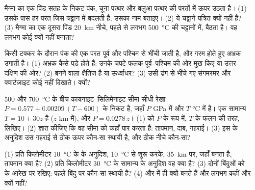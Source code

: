 \begin{exercise}[$\star\star$]\label{exo:g12:metamorphic-rocks:10}
मैग्मा का एक पिंड सतह के निकट पंक, चूना पत्थर और बलुआ पत्थर की परतों में ऊपर उठता है।
(1) उसके पास हर परत जिस चट्टान में बदलती है, उसका नाम बताइए। (2) ये
चट्टानें पत्रित क्यों नहीं हैं? (3) मैग्मा का एक दूसरा पिंड \qty{20}{km} नीचे,
पहले से लगभग \qty{500}{\celsius} की चट्टानों में, बैठता है। वह लगभग कोई  क्यों नहीं बनाता?
\end{exercise}

\begin{exercise}[$\star\star$]\label{exo:g12:metamorphic-rocks:11}
किसी टक्कर के दौरान पंक की एक परत पूर्व और पश्चिम से भींची जाती है,
और गरम होते हुए अभ्रक उगाती है। (1) अभ्रक कैसे पड़े होते हैं: उनके चपटे फलक
पूर्व--पश्चिम की ओर मुख किए या उत्तर--दक्षिण की ओर? (2) बनने वाला 
क्षैतिज है या ऊर्ध्वाधर? (3) उसी ढंग से भींचे गए संगमरमर और क्वार्टज़ाइट
कोई  नहीं दिखाते। क्यों?
\end{exercise}

\begin{exercise}[$\star\star\star$]\label{exo:g12:metamorphic-rocks:12}
500 और \qty{700}{\celsius} के बीच कायनाइट--सिलिमेनाइट सीमा
सीधी रेखा $P = 0.577 + 0.00209\,(T - 600)$ के निकट है, जहाँ $P$
\unit{GPa} में और $T$ \unit{\celsius} में है। एक सामान्य  $T = 10 + 30z$ है
($z$ \unit{km} में), और $P = 0.0278\,z$। (1)  को $P$ के रूप में,
$T$ के फलन की तरह, लिखिए। (2) ज्ञात कीजिए कि वह सीमा को कहाँ पार करता है: तापमान, दाब,
गहराई। (3) इस  के अनुदिश उस गहराई से ठीक ऊपर कौन-सा  स्थायी है,
और ठीक नीचे कौन-सा?
\end{exercise}

\begin{exercise}[$\star\star\star$]\label{exo:g12:metamorphic-rocks:13}
(1) प्रति किलोमीटर \qty{10}{\celsius} के   के अनुदिश,
\qty{10}{\celsius} से शुरू करके, \qty{35}{km} पर, जहाँ
 बनता है, तापमान क्या है? (2) प्रति किलोमीटर \qty{30}{\celsius} के
सामान्य  के अनुदिश वह क्या है? (3) दोनों बिंदुओं को  के
आरेख पर रखिए: पहले बिंदु पर कौन-सा  स्थायी है? (4)  और
  में ही क्यों बनते हैं और लगभग कहीं और क्यों नहीं?
\end{exercise}

